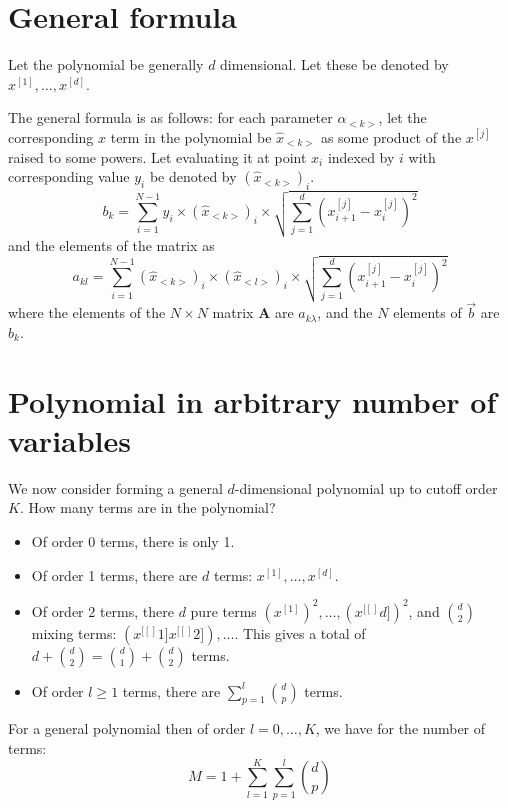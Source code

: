 \documentclass[11pt]{article}
\newcommand{\xdim}[1]{x^{[#1]}}
\begin{document}

\section{General formula}


Let the polynomial be generally $d$ dimensional. Let these be denoted by $\xdim{1},\dots,\xdim{d}$. 

The general formula is as follows: for each parameter $\alpha_{<k>}$, let the corresponding $x$ term in the polynomial be $\hat{x}_{<k>}$ as some product of the $\xdim{j}$ raised to some powers. Let evaluating it at point $x_i$ indexed by $i$ with corresponding value $y_i$ be denoted by $(\hat{x}_{<k>})_i$.
\begin{equation}
b_k = 
\sum_{i=1}^{N-1} 
y_i \times
(\hat{x}_{<k>})_i \times
\sqrt{ \sum_{j=1}^d ( \xdim{j}_{i+1} - \xdim{j}_i )^2 }
\end{equation}
and the elements of the matrix as
\begin{equation}
a_{kl} = \sum_{i=1}^{N-1} 
(\hat{x}_{<k>})_i \times
(\hat{x}_{<l>})_i \times
\sqrt{ \sum_{j=1}^d ( \xdim{j}_{i+1} - \xdim{j}_i )^2 }
\end{equation}
where the elements of the $N \times N$ matrix $\boldsymbol{A}$ are $a_{k\lambda}$, and the $N$ elements of $\vec{b}$ are $b_k$.



\section{Polynomial in arbitrary number of variables}


We now consider forming a general $d$-dimensional polynomial up to cutoff order $K$. How many terms are in the polynomial?
\begin{itemize}
\item Of order 0 terms, there is only 1. 
\item Of order 1 terms, there are $d$ terms: $\xdim{1}, \dots, \xdim{d}$. 
\item Of order $2$ terms, there $d$ pure terms $(\xdim{1})^2, \dots, (\xdim[d])^2$, and $\binom{d}{2}$ mixing terms: $(\xdim[1] \xdim[2]), \dots $. This gives a total of $d + \binom{d}{2} = \binom{d}{1} + \binom{d}{2}$ terms.
\item Of order $l \geq 1$ terms, there are $\sum_{p=1}^l \binom{d}{p}$ terms.
\end{itemize}
For a general polynomial then of order $l=0,\dots,K$, we have for the number of terms:
\begin{equation}
M = 1 + \sum_{l=1}^K \sum_{p=1}^l \binom{d}{p}
\end{equation}
\end{document}
